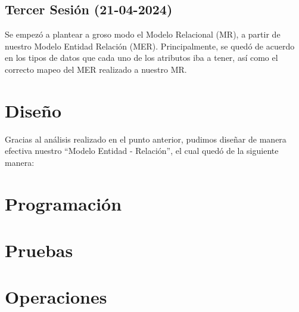 \documentclass[12pt, a4paper]{article}
\begin{document}
	\subsection{Tercer Sesión (21-04-2024)}
	Se empezó a plantear a groso modo el Modelo Relacional (MR), a partir de nuestro Modelo Entidad Relación (MER). Principalmente, se quedó de acuerdo en los tipos de datos que cada uno de los atributos iba a tener, así como el correcto mapeo del MER realizado a nuestro MR.
	
	\section{Diseño}
	Gracias al análisis realizado en el punto anterior, pudimos diseñar de manera efectiva nuestro “Modelo Entidad - Relación”, el cual quedó de la siguiente manera:
	
	\section{Programación}
	
	\section{Pruebas}
	
	\section{Operaciones}
	
\end{document}
